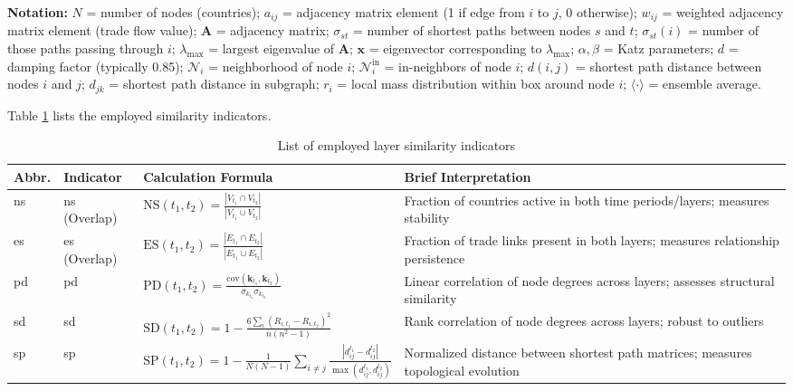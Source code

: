 \documentclass[preprint, 3p,
authoryear]{elsarticle} %
\begin{document}
\noindent \textbf{Notation:} \(N\) = number of nodes (countries);
\(a_{ij}\) = adjacency matrix element (1 if edge from \(i\) to \(j\), 0
otherwise); \(w_{ij}\) = weighted adjacency matrix element (trade flow
value); \(\mathbf{A}\) = adjacency matrix; \(\sigma_{st}\) = number of
shortest paths between nodes \(s\) and \(t\); \(\sigma_{st}(i)\) =
number of those paths passing through \(i\); \(\lambda_{\max}\) =
largest eigenvalue of \(\mathbf{A}\); \(\mathbf{x}\) = eigenvector
corresponding to \(\lambda_{\max}\); \(\alpha, \beta\) = Katz
parameters; \(d\) = damping factor (typically 0.85); \(\mathcal{N}_i\) =
neighborhood of node \(i\); \(\mathcal{N}_i^{\text{in}}\) = in-neighbors
of node \(i\); \(d(i,j)\) = shortest path distance between nodes \(i\)
and \(j\); \(d_{jk}\) = shortest path distance in subgraph; \(r_i\) =
local mass distribution within box around node \(i\);
\(\langle \cdot \rangle\) = ensemble average.

Table \ref{tab:layersim} lists the employed similarity indicators.

\begin{longtable}{p{1.2cm}p{3.5cm}p{5.5cm}p{5cm}}
\caption{List of employed layer similarity indicators}\label{tab:layersim} \\
\toprule
\textbf{Abbr.} & \textbf{Indicator} & \textbf{Calculation Formula} & \textbf{Brief Interpretation} \\
\midrule

\acrshort{ns} & \acrlong{ns} (Overlap) & $\text{NS}(t_1, t_2) = \frac{|V_{t_1} \cap V_{t_2}|}{|V_{t_1} \cup V_{t_2}|}$ & Fraction of countries active in both time periods/layers; measures stability \\
\addlinespace

\acrshort{es} & \acrlong{es} (Overlap) & $\text{ES}(t_1, t_2) = \frac{|E_{t_1} \cap E_{t_2}|}{|E_{t_1} \cup E_{t_2}|}$ & Fraction of trade links present in both layers; measures relationship persistence \\
\addlinespace

\acrshort{pd} & \acrlong{pd} & $\text{PD}(t_1, t_2) = \frac{\text{cov}(\mathbf{k}_{t_1}, \mathbf{k}_{t_2})}{\sigma_{k_{t_1}} \sigma_{k_{t_2}}}$ & Linear correlation of node degrees across layers; assesses structural similarity \\
\addlinespace

\acrshort{sd} & \acrlong{sd} & $\text{SD}(t_1, t_2) = 1 - \frac{6 \sum_i (R_{i,t_1} - R_{i,t_2})^2}{n(n^2-1)}$ & Rank correlation of node degrees across layers; robust to outliers \\
\addlinespace

\acrshort{sp} & \acrlong{sp} & $\text{SP}(t_1, t_2) = 1 - \frac{1}{N(N-1)} \sum_{i \neq j} \frac{|d_{ij}^{t_1} - d_{ij}^{t_2}|}{\max(d_{ij}^{t_1}, d_{ij}^{t_2})}$ & Normalized distance between shortest path matrices; measures topological evolution \\

\bottomrule
\end{longtable}
\end{document}
